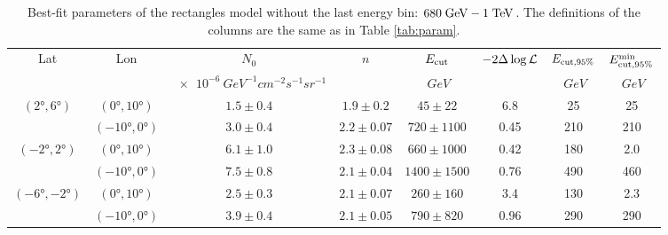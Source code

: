 \begin{table}
  \begin{center}
    \caption{Best-fit parameters of the rectangles model without the last energy bin: $680\;{\rm GeV} - 1\;{\rm TeV}$.
    The definitions of the columns are the same as in Table \ref{tab:param}.
    }
        \begin{tabular}{|c|c|c|c|c|c|c|c|} %
     	\hline
		 Lat & Lon  & $N_0$ & $n$ & $E_{\rm cut}$ &  $-2 \Delta \log {\mathcal{L}}$ & $E_{\rm cut, 95\%}$ & $E_{\rm cut, 95\%}^{\rm min}$ \\ 
		     &        &  {\small $\SI{e-6}{GeV^{-1}cm^{-2}s^{-1} sr^{-1}}$ }&  & {\small $\SI{}{GeV}$ }& &{\small  $\SI{}{GeV}$ }&{\small  $\SI{}{GeV}$ }\\ 
		\hline
  		$(\ang{2}, \ang{6})$ & $(\ang{0}, \ang{10})$ & $1.5 \pm 0.4$ & $1.9 \pm 0.2$ & $45 \pm 22$ & 6.8 &25 & 25\\ 
		& $(\ang{-10}, \ang{0})$ & $3.0 \pm 0.4$ & $2.2 \pm 0.07$ & $720 \pm 1100$ & 0.45 & 210 & 210\\ 
 		\hline
  		$(\ang{-2}, \ang{2})$ & $(\ang{0}, \ang{10})$ & $6.1 \pm 1.0$ & $2.3 \pm 0.08$  & $660 \pm 1000$ & 0.42 & 180 & 2.0 \\ 
		& $(\ang{-10}, \ang{0})$ & $7.5 \pm 0.8$ & $2.1 \pm 0.04$ & $1400 \pm 1500$ & 0.76 & 490 & 460\\ 
 		\hline
  		$(\ang{-6}, \ang{-2})$ & $(\ang{0}, \ang{10})$ & $2.5 \pm 0.3$ & $2.1 \pm 0.07$ & $260 \pm 160$ & 3.4 & 130 & 2.3  \\ 
		& $(\ang{-10}, \ang{0})$ & $3.9 \pm 0.4$ & $2.1 \pm 0.05$ & $790 \pm 820$ & 0.96 & 290 & 290\\ 
 \hline
    \end{tabular}
  \end{center}
\end{table}
